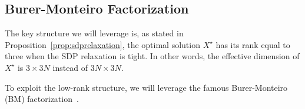 

    

    



\subsection{Burer-Monteiro Factorization}

The key structure we will leverage is, as stated in Proposition~\ref{prop:sdprelaxation}, the optimal solution $X^\star$ has its rank equal to three when the SDP relaxation is tight. In other words, the effective dimension of $X^\star$ is $3 \times 3N$ instead of $3N \times 3N$.

To exploit the low-rank structure, we will leverage the famous Burer-Monteiro (BM) factorization~\cite{burer2003nonlinear}.


